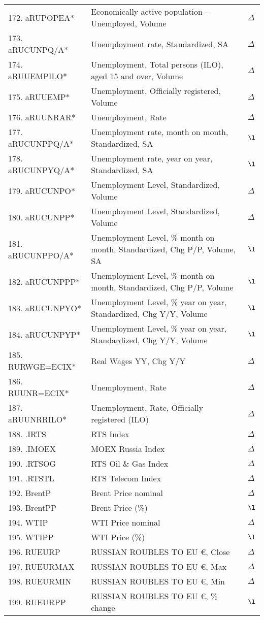 \documentclass[a4paper, 14pt]{article}
\begin{document}
\begin{center}
\begin{longtable}{p{5.5cm} p{10cm} p{0.15cm}}
	172. aRUPOPEA* &  Economically active population - Unemployed, Volume & $\Delta$\\
	173. aRUCUNPQ/A* &  Unemployment rate, Standardized, SA & $\Delta$\\
	174. aRUUEMPILO* &  Unemployment, Total persons (ILO), aged 15 and over, Volume & $\Delta$\\
	175. aRUUEMP* &  Unemployment, Officially registered, Volume & $\Delta$\\
	176. aRUUNRAR* &  Unemployment, Rate & $\Delta$\\
	177. aRUCUNPPQ/A* &  Unemployment rate, month on month, Standardized, SA & $\l$\\
	178. aRUCUNPYQ/A* &  Unemployment rate, year on year, Standardized, SA & $\l$\\
	179. aRUCUNPO* &  Unemployment Level, Standardized, Volume & $\Delta$\\
	180. aRUCUNPP* &  Unemployment Level, Standardized, Volume & $\Delta$\\
	181. aRUCUNPPO/A* &  Unemployment Level, \% month on month, Standardized, Chg P/P, Volume, SA & $\l$\\
	182. aRUCUNPPP* &  Unemployment Level, \% month on month, Standardized, Chg P/P, Volume & $\l$\\
	183. aRUCUNPYO* &  Unemployment Level, \% year on year, Standardized, Chg Y/Y, Volume & $\l$\\
	184. aRUCUNPYP* &  Unemployment Level, \% year on year, Standardized, Chg Y/Y, Volume & $\l$\\
	185. RURWGE=ECIX* &  Real Wages YY, Chg Y/Y & $\Delta$\\
	186. RUUNR=ECIX* &  Unemployment, Rate & $\Delta$\\
	187. aRUUNRRILO* &  Unemployment, Rate, Officially registered (ILO) & $\Delta$\\
	188. .IRTS & RTS Index & $\Delta$\\
	189. .IMOEX & MOEX Russia Index & $\Delta$\\
	190. .RTSOG & RTS Oil \& Gas Index & $\Delta$\\
	191. .RTSTL & RTS Telecom Index & $\Delta$\\
	192. BrentP & Brent Price nominal & $\Delta$\\
	193. BrentPP & Brent Price (\%) & $\l$\\
	194. WTIP & WTI Price nominal & $\Delta$\\
	195. WTIPP & WTI Price (\%) & $\l$\\
	196. RUEURP &  RUSSIAN ROUBLES TO EU \euro{}, Close & $\Delta$\\
	197. RUEURMAX &  RUSSIAN ROUBLES TO EU \euro{}, Max & $\Delta$\\
	198. RUEURMIN &  RUSSIAN ROUBLES TO EU \euro{}, Min & $\Delta$\\
	199. RUEURPP &  RUSSIAN ROUBLES TO EU \euro{}, \% change & $\l$\\
	\end{longtable}
\end{center}






\newpage


\end{document}
